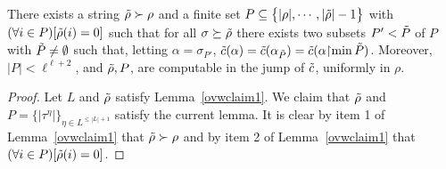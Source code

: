 \begin{lemma}\label{ovwprop1}

There exists a string $\tilde{\rho}\succ\rho$
 and a finite set $P\subseteq
 \big\{|\rho|,\cdots, |\tilde{\rho}|-1\big\}$ with
 $(\forall i\in P)[\tilde{\rho}(i) = 0]$
 such that
 for all $\sigma\succeq \tilde{\rho}$ there exists
 two subsets $P'<\tilde{P}$ of $P$ with $\tilde{P}\ne\emptyset$
 such that, letting $\alpha = \sigma_{P'}$,
$\tilde{c}(\alpha) = \tilde{c}(\alpha_{\tilde{P}}) = \tilde{c}(\alpha
 {\upharpoonright} {\min \tilde{P} })$.
 Moreover, $|P|< \ell^{\ell+2}$, and $\tilde{\rho}, P$,
are computable in the jump of $\tilde{c}$, uniformly in $\rho$.
\end{lemma}
\begin{proof}
Let $L$ and $\tilde{\rho}$ satisfy Lemma~\ref{ovwclaim1}.
We claim that $\tilde{\rho}$ and $P = \{|\tau^\eta|\}_{\eta\in L^{\leq |L|+1}}$
satisfy the current lemma.
It is clear
by item 1 of Lemma~\ref{ovwclaim1} that $\tilde{\rho}\succ\rho$
and by item 2 of  Lemma~\ref{ovwclaim1} that
$(\forall i\in P)[\tilde{\rho}(i) = 0]$.


\end{proof}
